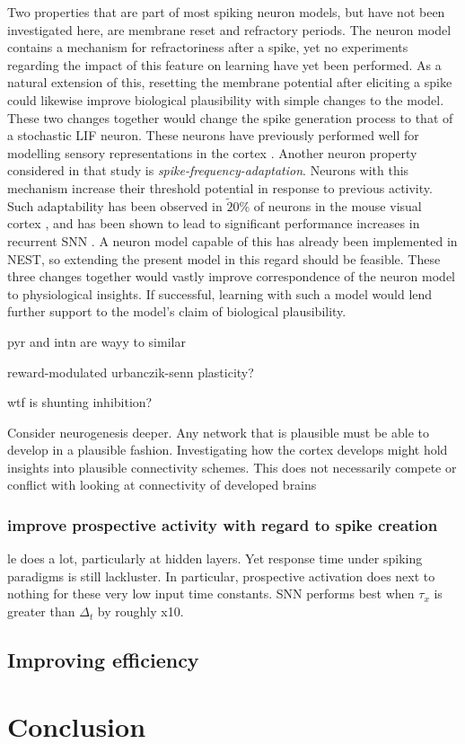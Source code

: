 Two properties that are part of most spiking neuron models, but have not been investigated here, are membrane reset and
refractory periods. The neuron model contains a mechanism for refractoriness after a spike, yet no experiments regarding
the impact of this feature on learning have yet been performed. As a natural extension of this, resetting the membrane
potential after eliciting a spike could likewise improve biological plausibility with simple changes to the model. These
two changes together would change the spike generation process to that of a stochastic LIF neuron. These neurons have
previously performed well for modelling sensory representations in the cortex \citep{Pillow2008}. Another neuron
property considered in that study is \textit{spike-frequency-adaptation}. Neurons with this mechanism increase their
threshold potential in response to previous activity. Such adaptability has been observed in $\tilde 20 \% $ of neurons
in the mouse visual cortex \citep{allen2018}, and has been shown to lead to significant performance increases in
recurrent SNN \citep{bellec2018long,bellec2020solution}. A neuron model capable of this has already been implemented in
NEST, so extending the present model in this regard should be feasible. These three changes together would vastly
improve correspondence of the neuron model to physiological insights. If successful, learning with such a model would
lend further support to the model's claim of biological plausibility.






pyr and intn are wayy to similar

reward-modulated urbanczik-senn plasticity?

wtf is shunting inhibition?

Consider neurogenesis deeper. Any network that is plausible must be able to develop in a plausible fashion. Investigating
how the cortex develops might hold insights into plausible connectivity schemes. This does not necessarily compete or
conflict with looking at connectivity of developed brains


\subsubsection{improve prospective activity with regard to spike creation}

le does a lot, particularly at hidden layers. Yet response time under spiking paradigms is still
lackluster. In particular, prospective activation does next to nothing for these very low input time
constants. SNN performs best when $\tau_x$ is greater than $\Delta_t$ by roughly x10.





\subsection{Improving efficiency}




\section{Conclusion}